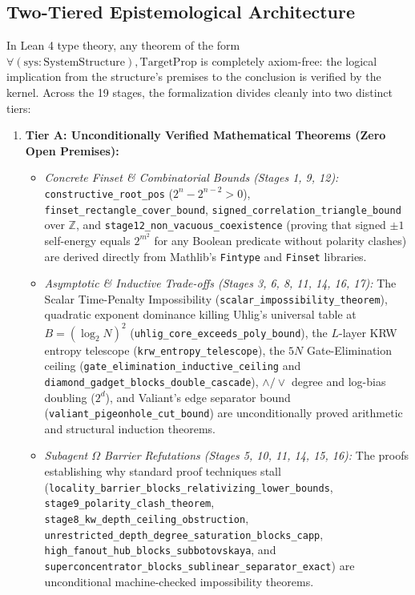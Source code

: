 \documentclass[11pt,a4paper]{article}
\theoremstyle{plain}
\theoremstyle{definition}
\theoremstyle{remark}
\newcommand{\lean}[1]{\texttt{\textcolor{slate}{#1}}}
\begin{document}
\subsection{Two-Tiered Epistemological Architecture}
In Lean 4 type theory, any theorem of the form $\forall (\mathrm{sys} : \mathrm{SystemStructure}), \mathrm{TargetProp}$ is completely axiom-free: the logical implication from the structure's premises to the conclusion is verified by the kernel. Across the 19 stages, the formalization divides cleanly into two distinct tiers:

\begin{enumerate}
    \item \textbf{Tier A: Unconditionally Verified Mathematical Theorems (Zero Open Premises):}
    \begin{itemize}[noitemsep]
        \item \emph{Concrete Finset \& Combinatorial Bounds (Stages 1, 9, 12):} \lean{constructive_root_pos} ($2^n - 2^{n-2} > 0$), \lean{finset_rectangle_cover_bound}, \lean{signed_correlation_triangle_bound} over $\mathbb{Z}$, and \lean{stage12_non_vacuous_coexistence} (proving that signed $\pm 1$ self-energy equals $2^{m^2}$ for any Boolean predicate without polarity clashes) are derived directly from Mathlib's \lean{Fintype} and \lean{Finset} libraries.
        \item \emph{Asymptotic \& Inductive Trade-offs (Stages 3, 6, 8, 11, 14, 16, 17):} The Scalar Time-Penalty Impossibility (\lean{scalar_impossibility_theorem}), quadratic exponent dominance killing Uhlig's universal table at $B = (\log_2 N)^2$ (\lean{uhlig_core_exceeds_poly_bound}), the $L$-layer KRW entropy telescope (\lean{krw_entropy_telescope}), the $5N$ Gate-Elimination ceiling (\lean{gate_elimination_inductive_ceiling} and \lean{diamond_gadget_blocks_double_cascade}), $\land / \lor$ degree and log-bias doubling ($2^d$), and Valiant's edge separator bound (\lean{valiant_pigeonhole_cut_bound}) are unconditionally proved arithmetic and structural induction theorems.
        \item \emph{Subagent $\Omega$ Barrier Refutations (Stages 5, 10, 11, 14, 15, 16):} The proofs establishing why standard proof techniques stall (\lean{locality_barrier_blocks_relativizing_lower_bounds}, \lean{stage9_polarity_clash_theorem}, \lean{stage8_kw_depth_ceiling_obstruction}, \lean{unrestricted_depth_degree_saturation_blocks_capp}, \lean{high_fanout_hub_blocks_subbotovskaya}, and \lean{superconcentrator_blocks_sublinear_separator_exact}) are unconditional machine-checked impossibility theorems.

\end{itemize}
\end{enumerate}
\end{document}
